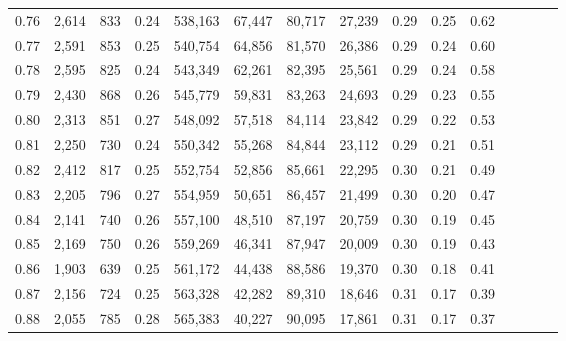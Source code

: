 \begin{tabular}{rrrcrrrrrrrrrrr}
0.76 &   2,614 &     833 &                                       0.24 &  538,163 &   67,447 &   80,717 &   27,239 &  0.29 &  0.25 &                         0.62 \\
0.77 &   2,591 &     853 &                                       0.25 &  540,754 &   64,856 &   81,570 &   26,386 &  0.29 &  0.24 &                         0.60 \\
0.78 &   2,595 &     825 &                                       0.24 &  543,349 &   62,261 &   82,395 &   25,561 &  0.29 &  0.24 &                         0.58 \\
0.79 &   2,430 &     868 &                                       0.26 &  545,779 &   59,831 &   83,263 &   24,693 &  0.29 &  0.23 &                         0.55 \\
0.80 &   2,313 &     851 &                                       0.27 &  548,092 &   57,518 &   84,114 &   23,842 &  0.29 &  0.22 &                         0.53 \\
0.81 &   2,250 &     730 &                                       0.24 &  550,342 &   55,268 &   84,844 &   23,112 &  0.29 &  0.21 &                         0.51 \\
0.82 &   2,412 &     817 &                                       0.25 &  552,754 &   52,856 &   85,661 &   22,295 &  0.30 &  0.21 &                         0.49 \\
0.83 &   2,205 &     796 &                                       0.27 &  554,959 &   50,651 &   86,457 &   21,499 &  0.30 &  0.20 &                         0.47 \\
0.84 &   2,141 &     740 &                                       0.26 &  557,100 &   48,510 &   87,197 &   20,759 &  0.30 &  0.19 &                         0.45 \\
0.85 &   2,169 &     750 &                                       0.26 &  559,269 &   46,341 &   87,947 &   20,009 &  0.30 &  0.19 &                         0.43 \\
0.86 &   1,903 &     639 &                                       0.25 &  561,172 &   44,438 &   88,586 &   19,370 &  0.30 &  0.18 &                         0.41 \\
0.87 &   2,156 &     724 &                                       0.25 &  563,328 &   42,282 &   89,310 &   18,646 &  0.31 &  0.17 &                         0.39 \\
0.88 &   2,055 &     785 &                                       0.28 &  565,383 &   40,227 &   90,095 &   17,861 &  0.31 &  0.17 &                         0.37 \\

\end{tabular}
